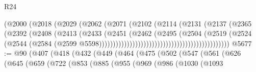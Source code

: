 \begin{lexlean}{R24}
\begin{coremodule}
{{{{{{{{{{{{{{{{{{{{{{{{{{{{{{{{{{{{{{{{{{{{{{{{{{{{{{{{{{{{{{{{{{{{{{{{{{{{{{{{{{{{{{{{{{{{{{{{{{{{{{{{{{{{{{{{{{{{{{{{{{{{{{{{{{{{{{{{{{{{{{{{{{{{{{{{{{{{{{{{{{{{{{{{{{{{{{{{{{{{{{{{{{{{{{{{{{{                                                    (@2000
                                                      (@2018
                                                        (@2029
                                                          (@2062
                                                            (@2071
                                                              (@2102
                                                                (@2114
                                                                  (@2131
                                                                    (@2137
                                                                      (@2365
                                                                        (@2392
                                                                          (@2408
                                                                            (@2413
                                                                              (@2433
                                                                                (@2451
                                                                                  (@2462
                                                                                    (@2495
                                                                                      (@2504
                                                                                        (@2519
                                                                                          (@2524
                                                                                            (@2544
                                                                                              (@2584
                                                                                                (@2599
                                                                                                  @5598)))))))))))))))))))))))))))))))))))))))))))))))
@5677 := @90
    (@407
      (@418
        (@432
          (@449
            (@464
              (@475
                (@502
                  (@547
                    (@561
                      (@626
                        (@645
                          (@659
                            (@722
                              (@853
                                (@885
                                  (@955
                                    (@969
                                      (@986
                                        (@1030
                                          (@1093
}}}}}}}}}}}}}}}}}}}}}}}}}}}}}}}}}}}}}}}}}}}}}}}}}}}}}}}}}}}}}}}}}}}}}}}}}}}}}}}}}}}}}}}}}}}}}}}}}}}}}}}}}}}}}}}}}}}}}}}}}}}}}}}}}}}}}}}}}}}}}}}}}}}}}}}}}}}}}}}}}}}}}}}}}}}}}}}}}}}}}}}}}}}}}}}}}}}
\end{coremodule}
\end{lexlean}
